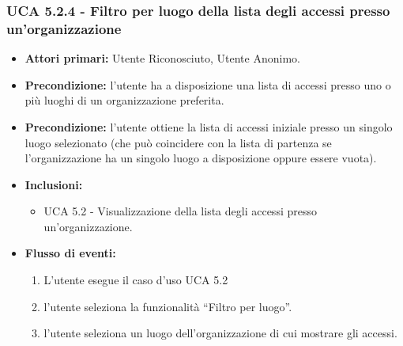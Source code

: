 \subsubsection{UCA 5.2.4 - Filtro per luogo della lista degli accessi presso un’organizzazione}
\begin{itemize}
    \item \textbf{Attori primari:} Utente Riconosciuto, Utente Anonimo.
    \item \textbf{Precondizione:} l’utente ha a disposizione una lista di accessi presso uno o più luoghi di un organizzazione preferita.
    \item \textbf{Precondizione:} l’utente ottiene la lista di accessi iniziale presso un singolo luogo selezionato (che può coincidere con la lista di partenza se l’organizzazione ha un singolo luogo a disposizione oppure essere vuota).
    \item \textbf{Inclusioni:} %
    \begin{itemize}
        \item UCA 5.2 - Visualizzazione della lista degli accessi presso un'organizzazione.
    \end{itemize}
    \item \textbf{Flusso di eventi:}
    \begin{enumerate}
        \item L'utente esegue il caso d'uso UCA 5.2
        \item l’utente seleziona la funzionalità “Filtro per luogo”.
        \item l’utente seleziona un luogo dell’organizzazione di cui mostrare gli accessi.
    \end{enumerate}
\end{itemize}